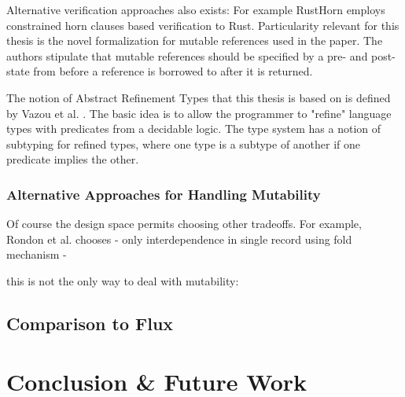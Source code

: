 \documentclass{book}
\theoremstyle{definition}
\begin{document}
Alternative verification approaches also exists: For example RustHorn\cite{matsushita_rusthorn_2020} employs constrained horn clauses based verification to Rust. Particularity relevant for this thesis is the novel formalization for mutable references used in the paper. The authors stipulate that mutable references should be specified by a pre- and post-state from before a reference is borrowed to after it is returned.

The notion of Abstract Refinement Types that this thesis is based on is defined by Vazou et al. \cite{vazou_abstract_2013}. The basic idea is to allow the programmer to "refine" language types with predicates from a decidable logic. The type system has a notion of subtyping for refined types, where one type is a subtype of another if one predicate implies the other.

\label{subsec:related-work-mutability} \subsection{Alternative Approaches for Handling Mutability}

Of course the design space permits choosing other tradeoffs. For example, Rondon et al. \cite{rondon_low-level_2010} chooses 
  - only interdependence in single record using fold mechanism
  - 

this is not the only way to deal with mutability: 

\section{Comparison to Flux}

\chapter{Conclusion \& Future Work}

\printbibliography
\end{document}
